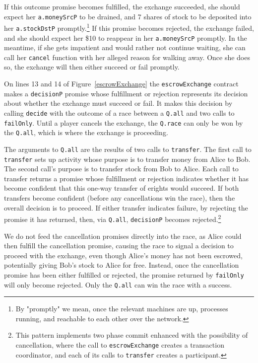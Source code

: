 \documentclass{llncs}
\begin{document}
If this outcome promise becomes fulfilled, the exchange succeeded,  she should expect her {\tt a.moneySrcP} to be drained, and 7 shares of stock to be deposited into her {\tt a.stockDstP} promptly.\footnote{
%
By "promptly" we mean, once the relevant machines are up, processes running, and reachable to each other over the network.
%
} If this promise becomes rejected, the exchange failed, and she should expect her \$10 to reappear in her {\tt a.moneySrcP} promptly. In the meantime, if she gets impatient and would rather not continue waiting, she can call her {\tt cancel} function with her alleged reason for walking away. Once she does so, the exchange will then either succeed or fail promptly.

On lines 13 and 14 of Figure~\ref{escrowExchange} the {\tt escrowExchange} contract makes a {\tt decisionP} promise whose fulfillment or rejection represents its decision about whether the exchange must succeed or fail. It makes this decision by calling {\tt decide} with the outcome of a race between a {\tt Q.all} and two calls to {\tt failOnly}. Until a player cancels the exchange, the {\tt Q.race} can only be won by the {\tt Q.all}, which is where the exchange is proceeding.

The arguments to {\tt Q.all} are the results of two calls to {\tt transfer}. The first call to {\tt transfer} sets up activity whose purpose is to transfer money from Alice to Bob. The second call's purpose is to transfer stock from Bob to Alice. Each call to transfer returns a promise whose fulfillment or rejection indicates whether it has become confident that this one-way transfer of erights would succeed. If both transfers become confident (before any cancellations win the race), then the overall decision is to proceed. If either transfer indicates failure, by rejecting the promise it has returned, then, via {\tt Q.all}, {\tt decisionP} becomes rejected.\footnote{
%
This pattern implements two phase commit enhanced with the possibility of cancellation, where the call to {\tt escrowExchange} creates a transaction coordinator, and each of its calls to {\tt transfer} creates a participant.}

We do not feed the cancellation promises directly into the race, as Alice could then fulfill the cancellation promise, causing the race to signal a decision to proceed with the exchange, even though Alice's money has not been escrowed, potentially giving Bob's stock to Alice for free. Instead, once the cancellation promise has been either fulfilled or rejected, the promise returned by {\tt failOnly} will only become rejected. Only the {\tt Q.all} can win the race with a success.
\end{document}
